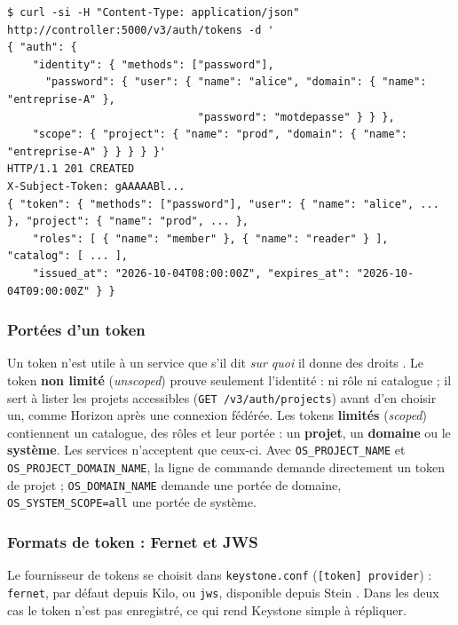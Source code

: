 \par\noindent\begin{minipage}{\linewidth}
\begin{lstlisting}[style=terminal]
$ curl -si -H "Content-Type: application/json" http://controller:5000/v3/auth/tokens -d '
{ "auth": {
    "identity": { "methods": ["password"],
      "password": { "user": { "name": "alice", "domain": { "name": "entreprise-A" },
                              "password": "motdepasse" } } },
    "scope": { "project": { "name": "prod", "domain": { "name": "entreprise-A" } } } } }'
HTTP/1.1 201 CREATED
X-Subject-Token: gAAAAABl...
{ "token": { "methods": ["password"], "user": { "name": "alice", ... }, "project": { "name": "prod", ... },
    "roles": [ { "name": "member" }, { "name": "reader" } ], "catalog": [ ... ],
    "issued_at": "2026-10-04T08:00:00Z", "expires_at": "2026-10-04T09:00:00Z" } }
\end{lstlisting}
\end{minipage}\par

\subsubsection{Portées d'un token}\label{sec:ks-portees}

Un token n'est utile à un service que s'il dit \emph{sur quoi} il donne des droits \parencite{keystone-tokens}. Le token
\textbf{non limité} (\emph{unscoped}) prouve seulement l'identité : ni rôle ni catalogue ; il sert à lister les projets accessibles
(\texttt{GET /v3/auth/projects}) avant d'en choisir un, comme Horizon après une connexion fédérée. Les tokens \textbf{limités}
(\emph{scoped}) contiennent un catalogue, des rôles et leur portée : un \textbf{projet}, un \textbf{domaine} ou le \textbf{système}.
Les services n'acceptent que ceux-ci. Avec \texttt{OS\_PROJECT\_NAME} et \texttt{OS\_PROJECT\_DOMAIN\_NAME}, la ligne de commande
demande directement un token de projet ; \texttt{OS\_DOMAIN\_NAME} demande une portée de domaine, \texttt{OS\_SYSTEM\_SCOPE=all} une
portée de système.

\subsubsection{Formats de token : Fernet et JWS}\label{sec:ks-formats}

Le fournisseur de tokens se choisit dans \texttt{keystone.conf} (\texttt{[token] provider}) : \texttt{fernet}, par défaut depuis Kilo,
ou \texttt{jws}, disponible depuis Stein \parencite{keystone-tokens}. Dans les deux cas le token n'est pas enregistré, ce qui rend
Keystone simple à répliquer.

